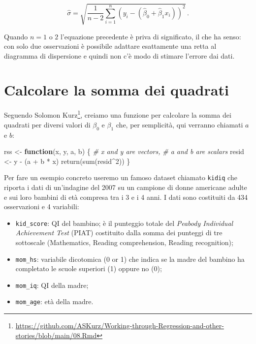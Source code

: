 \documentclass[
  11pt,
]{krantz}
\makeatletter
\newenvironment{Shaded}{\begin{snugshade}}{\end{snugshade}}
\newcommand{\CommentTok}[1]{\textcolor[rgb]{0.37,0.37,0.37}{\textit{#1}}}
\newcommand{\ControlFlowTok}[1]{\textcolor[rgb]{0.27,0.27,0.27}{\textbf{#1}}}
\newcommand{\DecValTok}[1]{\textcolor[rgb]{0.06,0.06,0.06}{#1}}
\newcommand{\FunctionTok}[1]{\textcolor[rgb]{0,0,0}{#1}}
\newcommand{\NormalTok}[1]{#1}
\newcommand{\OtherTok}[1]{\textcolor[rgb]{0.37,0.37,0.37}{#1}}
\newcommand{\SpecialCharTok}[1]{\textcolor[rgb]{0,0,0}{#1}}
\providecommand{\tightlist}{%
  \setlength{\itemsep}{0pt}\setlength{\parskip}{0pt}}
\renewcommand{\href}[2]{#2\footnote{\url{#1}}}
\newenvironment{kframe}{%
\medskip{}
\setlength{\fboxsep}{.8em}
 \def\at@end@of@kframe{}%
 \ifinner\ifhmode%
  \def\at@end@of@kframe{\end{minipage}}%
  \begin{minipage}{\columnwidth}%
 \fi\fi%
 \def\FrameCommand##1{\hskip\@totalleftmargin \hskip-\fboxsep
 \colorbox{shadecolor}{##1}\hskip-\fboxsep
     \hskip-\linewidth \hskip-\@totalleftmargin \hskip\columnwidth}%
 \MakeFramed {\advance\hsize-\width
   \@totalleftmargin\z@ \linewidth\hsize
   \@setminipage}}%
 {\par\unskip\endMakeFramed%
 \at@end@of@kframe}
\renewenvironment{Shaded}{\begin{kframe}}{\end{kframe}}
\theoremstyle{definition}
\theoremstyle{definition}
\theoremstyle{definition}
\theoremstyle{definition}
\theoremstyle{remark}
\makeatother
\begin{document}
\begin{equation}
\hat{\sigma} = \sqrt{\frac{1}{n-2} \sum_{i=1}^n (y_i - (\hat{\beta}_0 + \hat{\beta}_1 x_i))^2}\, .
\end{equation}

Quando \(n = 1\) o \(2\) l'equazione precedente è priva di significato, il che ha senso: con solo due osservazioni è possibile adattare esattamente una retta al diagramma di dispersione e quindi non c'è modo di stimare l'errore dai dati.

\hypertarget{calcolare-la-somma-dei-quadrati}{%
\section{Calcolare la somma dei quadrati}\label{calcolare-la-somma-dei-quadrati}}

Seguendo \href{https://github.com/ASKurz/Working-through-Regression-and-other-stories/blob/main/08.Rmd}{Solomon Kurz}, creiamo una funzione per calcolare la somma dei quadrati per diversi valori di \(\beta_0\) e \(\beta_1\) che, per semplicità, qui verranno chiamati \(a\) e \(b\):

\begin{Shaded}
\begin{Highlighting}[]
\NormalTok{rss }\OtherTok{\textless{}{-}} \ControlFlowTok{function}\NormalTok{(x, y, a, b) \{  }
  \CommentTok{\# x and y are vectors, }
  \CommentTok{\# a and b are scalars }
\NormalTok{  resid }\OtherTok{\textless{}{-}}\NormalTok{ y }\SpecialCharTok{{-}}\NormalTok{ (a }\SpecialCharTok{+}\NormalTok{ b }\SpecialCharTok{*}\NormalTok{ x)}
  \FunctionTok{return}\NormalTok{(}\FunctionTok{sum}\NormalTok{(resid}\SpecialCharTok{\^{}}\DecValTok{2}\NormalTok{))}
\NormalTok{  \}}
\end{Highlighting}
\end{Shaded}

Per fare un esempio concreto useremo un famoso dataset chiamato \texttt{kidiq} \citep{gelman2020regression} che riporta i dati di un'indagine del 2007 su un campione di donne americane adulte e sui loro bambini di età compresa tra i 3 e i 4 anni. I dati sono costituiti da 434 osservazioni e 4 variabili:

\begin{itemize}
\tightlist
\item
  \texttt{kid\_score}: QI del bambino; è il punteggio totale del \emph{Peabody Individual Achievement Test} (PIAT) costituito dalla somma dei punteggi di tre sottoscale (Mathematics, Reading comprehension, Reading recognition);
\item
  \texttt{mom\_hs}: variabile dicotomica (0 or 1) che indica se la madre del bambino ha completato le scuole superiori (1) oppure no (0);
\item
  \texttt{mom\_iq}: QI della madre;
\item
  \texttt{mom\_age}: età della madre.
\end{itemize}
\end{document}
